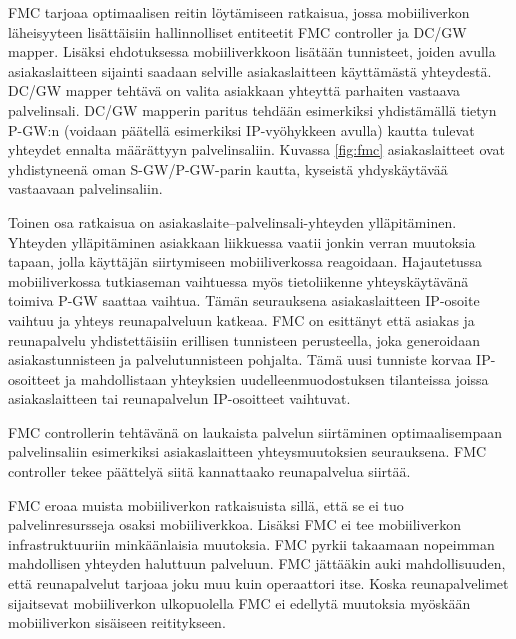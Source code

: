 FMC tarjoaa optimaalisen reitin löytämiseen ratkaisua, jossa mobiiliverkon läheisyyteen lisättäisiin hallinnolliset entiteetit FMC controller ja DC/GW mapper.
Lisäksi ehdotuksessa mobiiliverkkoon lisätään tunnisteet, joiden avulla asiakaslaitteen sijainti saadaan selville asiakaslaitteen käyttämästä yhteydestä.
DC/GW mapper tehtävä on valita asiakkaan yhteyttä parhaiten vastaava palvelinsali.
DC/GW mapperin paritus tehdään esimerkiksi yhdistämällä tietyn P-GW:n (voidaan päätellä esimerkiksi IP-vyöhykkeen avulla) kautta tulevat yhteydet ennalta määrättyyn palvelinsaliin. 
Kuvassa \ref{fig:fmc} asiakaslaitteet ovat yhdistyneenä oman S-GW/P-GW-parin kautta, kyseistä yhdyskäytävää vastaavaan palvelinsaliin. 

Toinen osa ratkaisua on asiakaslaite–palvelinsali-yhteyden ylläpitäminen.
Yhteyden ylläpitäminen asiakkaan liikkuessa vaatii jonkin verran muutoksia tapaan, jolla käyttäjän siirtymiseen mobiiliverkossa reagoidaan. 
Hajautetussa mobiiliverkossa tutkiaseman vaihtuessa myös tietoliikenne yhteyskäytävänä toimiva P-GW saattaa vaihtua. Tämän seurauksena asiakaslaitteen IP-osoite vaihtuu ja yhteys reunapalveluun katkeaa.
FMC on esittänyt että asiakas ja reunapalvelu yhdistettäisiin erillisen tunnisteen perusteella, joka generoidaan asiakastunnisteen ja palvelutunnisteen pohjalta.
Tämä uusi tunniste korvaa IP-osoitteet ja mahdollistaan yhteyksien uudelleenmuodostuksen tilanteissa joissa asiakaslaitteen tai reunapalvelun IP-osoitteet vaihtuvat.

FMC controllerin tehtävänä on laukaista palvelun siirtäminen optimaalisempaan palvelinsaliin esimerkiksi asiakaslaitteen yhteysmuutoksien seurauksena.
FMC controller tekee päättelyä siitä kannattaako reunapalvelua siirtää.

FMC eroaa muista mobiiliverkon ratkaisuista sillä, että se ei tuo palvelinresursseja osaksi mobiiliverkkoa. Lisäksi FMC ei tee mobiiliverkon infrastruktuuriin minkäänlaisia muutoksia. FMC pyrkii takaamaan nopeimman mahdollisen yhteyden haluttuun palveluun. FMC jättääkin auki mahdollisuuden, että reunapalvelut tarjoaa joku muu kuin operaattori itse.
Koska reunapalvelimet sijaitsevat mobiiliverkon ulkopuolella FMC ei edellytä muutoksia myöskään mobiiliverkon sisäiseen reititykseen.
